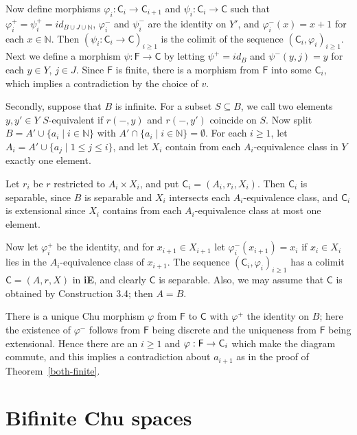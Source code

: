 \documentclass{LMCS}
\let\epf\endproof
\begin{document}
Now define morphisms $\varphi_i: \mathsf{C}_i \to \mathsf{C}_{i+1}$
and $\psi_i: \mathsf{C}_i \to \mathsf{C}$ such that $\varphi^+_i = \psi^+_i =
id_{B \cup J \cup \mathbb{N}}$, $\varphi_i^-$ and $\psi_i^-$ are the
identity on $Y'$, and $\varphi_i^-(x) = x+1$ for each $x \in
\mathbb{N}$. Then $(\psi_i: \mathsf{C}_i \to \mathsf{C})_{i \geq 1}$
is the colimit of the sequence $(\mathsf{C}_i, \varphi_i)_{i \geq 1}$. 
Next we define a morphism $\psi: \mathsf{F} \to \mathsf{C}$ by letting
$\psi^+ = id_{B}$ and $\psi^-(y,j)=y$ for each $y \in Y$, $j \in J$. 
Since $\mathsf{F}$ is finite, there is a morphism from $\mathsf{F}$
into some $\mathsf{C}_i$, which implies a contradiction by the choice
of $v$. 

Secondly, suppose that $B$ is infinite. For a subset $S \subseteq B$,
we call two elements $y,y' \in Y $ $S$-equivalent if $r(-,y)$ and
$r(-,y')$ coincide on $S$.  Now split $B = A' \cup \{ a_i \mid i \in
\mathbb{N} \} $ with $A' \cap \{a_i \mid i \in \mathbb{N}\} =
\emptyset$.  For each $i \geq 1$, let $A_i = A' \cup \{a_j \mid 1 \leq
j \leq i\}$, and let $X_i$ contain from each $A_i$-equivalence class
in $Y$ exactly one element. 

Let  $r_i$  be  $r$  restricted to  $A_i \times X_i$, and put
$\mathsf{C}_i = (A_i, r_i, X_i).$
Then  $\mathsf{C}_i$  is separable, since  $B$  is separable and  $X_i$  intersects
each  $A_i$-equivalence class, and  $\mathsf{C}_i$  is extensional since  $X_i$
contains from each  $A_i$-equivalence class at most one element. 

Now let  $\varphi_i^+$  be the identity, and for  $x_{i+1} \in X_{i+1} $
let  $\varphi_i^-(x_{i+1}) = x_i $ if  $x_i \in X_i $ lies in the
$A_i$-equivalence class of  $x_{i+1}$. 
The sequence  $(\mathsf{C}_i,\varphi_i)_{i \geq 1} $  has a colimit  $\mathsf{C} = (A,r,X)$
in  {\bf iE}, and clearly $\mathsf{C}$ is separable. Also, we may assume that  $\mathsf{C}$  is
obtained by Construction 3.4; then  $A = B$. 

There is a unique Chu morphism $\varphi$ from $\mathsf{F}$ to $\mathsf{C}$ with
$\varphi^+$ the identity on $B$; here the existence of $\varphi^-$
follows from $\mathsf{F}$ being discrete and the uniqueness from $\mathsf{F}$
being extensional.  Hence there are an $ i \geq 1$ and $\varphi: {\sf
F} \to \mathsf{C}_i$ which make the diagram commute, and this implies a
contradiction about $a_{i+1}$ as in the proof of
Theorem~\ref{both-finite}.  \epf

\section{Bifinite Chu spaces}
\end{document}
